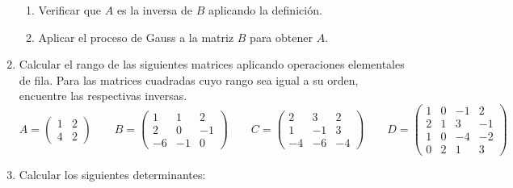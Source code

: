 \documentclass[12pt]{article}
\begin{document}
\begin{enumerate}
$$$$
\begin{enumerate}
  \item Verificar que $A$ es la inversa de $B$ aplicando la definición.
  \item Aplicar el proceso de Gauss a la matriz $B$ para obtener $A$.
\end{enumerate}
\item Calcular el rango de las siguientes matrices aplicando operaciones elementales de fila. Para las matrices cuadradas cuyo rango sea igual a su orden, encuentre las respectivas
inversas.
$$
A = \begin{pmatrix} 
  1 & 2 \\ 
  4 & 2 \end{pmatrix}\qquad 
B = \begin{pmatrix}
  1 & 1 & 2 \\
  2 & 0 & -1 \\
  -6 & -1 & 0 \end{pmatrix} \qquad
C = \begin{pmatrix}
  2 & 3 & 2 \\
  1 & -1 & 3 \\
  -4 & -6 & -4 \end{pmatrix}\qquad
D = \begin{pmatrix}
  1 & 0 & -1 & 2 \\
  2 & 1 & 3 & -1 \\
  1 & 0 & -4 & -2 \\
  0 & 2 & 1 & 3 \end{pmatrix}
$$
\item Calcular los siguientes determinantes:
\begin{multicols}{4}
\end{multicols}
\end{enumerate}
\end{document}
